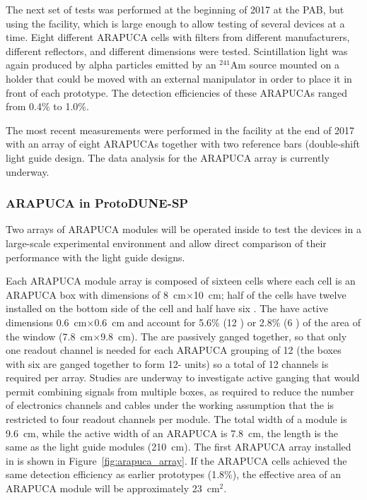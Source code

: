 The next set of tests was performed at the beginning of 2017 at the PAB, but using the  facility, which is large enough to allow testing of several devices at a time. Eight different ARAPUCA cells with filters from different manufacturers, different reflectors, and different dimensions were tested.  Scintillation light was again produced by alpha particles emitted by an $^{241}$Am  source mounted on a holder that could be moved with an external manipulator in order to place it in 
front of each prototype. The detection efficiencies of these ARAPUCAs ranged from 0.4\% to 1.0\%.

The most recent measurements were performed in the  facility at the end of 2017 with an array of eight ARAPUCAs together with two reference bars (double-shift light guide design. The data analysis for the ARAPUCA array is currently underway. 


\subsubsection{ARAPUCA in ProtoDUNE-SP}

Two arrays of ARAPUCA modules will be operated inside  to test the devices in a large-scale experimental environment and allow direct comparison of their performance with the light guide designs. 
 
Each  ARAPUCA module array is composed of sixteen cells where each cell is an ARAPUCA box with dimensions of \SI{8}{cm}$\times$\SI{10}{cm}; half of the cells have twelve  installed on the bottom side of the cell and  half have six . The  have active dimensions \SI{0.6}{cm}$\times$\SI{0.6}{cm} and account for 5.6\% (\num{12} ) or \num{2.8}\% (\num{6} ) of the area of the window (\SI{7.8}{cm}$\times$\SI{9.8}{cm}).
The   are passively ganged together, so that only one readout channel is needed for each ARAPUCA grouping of \num{12}  (the boxes with six  are ganged together to form \num{12}- units) so a total of \num{12} channels is required per array. Studies are underway to investigate active ganging that would permit combining signals from multiple boxes, as required to reduce the number of electronics channels and cables under the working assumption that the \single {} is restricted to four readout channels per  module. 
The total width of a module is \SI{9.6}{cm}, while the active width of an ARAPUCA is \SI{7.8}{cm}, the length is the same as the light guide modules (\SI{210}{cm}). 
The first ARAPUCA array installed in  is shown in Figure~\ref{fig:arapuca_array}. If the ARAPUCA cells achieved the same detection efficiency as earlier prototypes (1.8\%), the effective area of an ARAPUCA module will be approximately \SI{23}{cm$^2$}.

